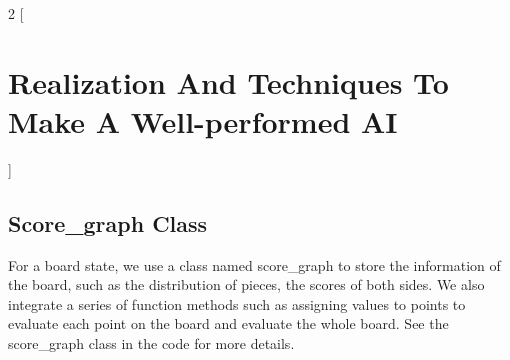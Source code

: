 \documentclass[a4paper, 12pt]{article} %
\begin{document}
\bigskip
\begin{multicols}{2}
    [
        \section{Realization And Techniques To Make A Well-performed AI}
    ]
    
    \subsection{Score\_graph Class}
    For a board state, we use a class named score\_graph to store the information of the board, such as the distribution of pieces, the scores of both sides. We also integrate a series of function methods such as assigning values to points to evaluate each point on the board and evaluate the whole board. See the score\_graph class in the code for more details.
    

\end{multicols}
\end{document}

